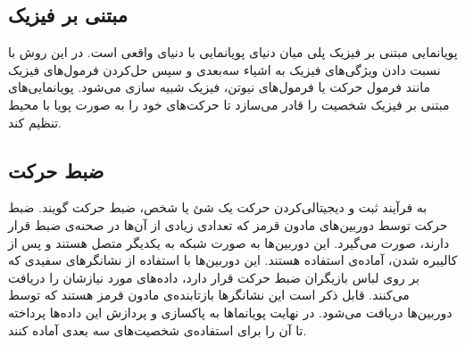 \subsection{مبتنی بر فیزیک}

پویانمایی مبتنی بر فیزیک پلی میان دنیای پویانمایی با 
دنیای واقعی است. در این روش با نسبت دادن ویژگی‌های فیزیک به اشیاء سه‌بعدی و سپس حل‌کردن
فرمول‌های فیزیک مانند فرمول حرکت یا فرمول‌های نیوتن،
فیزیک شبیه سازی می‌شود.
پویانمایی‌های مبتنی بر فیزیک شخصیت را قادر می‌سازد تا حرکت‌های خود را 
به صورت پویا با محیط تنظیم کند.

\subsection{ضبط حرکت
\protect {}}

به فرآیند ثبت و دیجیتالی‌کردن حرکت یک شئ یا شخص، ضبط حرکت گویند.
ضبط حرکت توسط دوربین‌های مادون قرمز که تعدادی زیادی از آن‌ها در صحنه‌ی ضبط قرار دارند، صورت می‌گیرد.
این دوربین‌ها به صورت شبکه به یکدیگر متصل هستند و پس از کالیبره شدن، آماده‌ی استفاده هستند.
این دوربین‌ها با استفاده از نشانگر‌های سفیدی که بر روی لباس بازیگران 
ضبط حرکت قرار دارد، داده‌های مورد نیازشان را دریافت می‌کنند.
قابل ذکر است این نشانگر‌ها بازتابنده‌ی مادون قرمز هستند که توسط دوربین‌ها دریافت می‌شود.
در نهایت پویانماها به پاکسازی و پردازش این داده‌ها پرداخته تا آن را 
برای استفاده‌ی شخصیت‌های سه بعدی آماده کنند.


